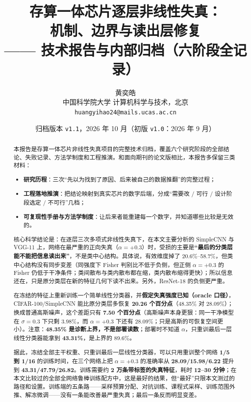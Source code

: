 \documentclass[11pt,a4paper]{ctexart}
\title{\bfseries 存算一体芯片逐层非线性失真：\\ 机制、边界与读出层修复\\[6pt]
       \large —— 技术报告与内部归档（六阶段全记录）}
\author{黄奕皓\\[2pt] \small 中国科学院大学 计算机科学与技术，北京\\ \small \texttt{huangyihao24@mails.ucas.ac.cn}}
\date{归档版本 \texttt{v1.1}，2026 年 10 月（初版 \texttt{v1.0}：2026 年 9 月）}
\begin{document}
\maketitle

\vspace{-1.0em}
\begin{abstract}
\noindent
本报告是存算一体芯片非线性失真项目的完整技术归档，覆盖六个研究阶段的全部结论、失败记录、方法学制度和工程推演。和面向期刊的论文版相比，本报告多保留三类材料：
\begin{itemize}[leftmargin=1.5em,itemsep=1pt]
\item \textbf{研究历程}：三次“先以为找到了原因、后来被自己的数据推翻”的完整过程；
\item \textbf{工程落地推演}：把结论映射到真实芯片的数字后端，分成“需要改 / 可行 / 设计阶段选定 / 不可行”几档；
\item \textbf{可复现性手册与方法学制度}：让后来者能重建每一个数字，并知道哪些比较是无效的。
\end{itemize}

核心科学结论是：在逐层三次多项式非线性失真下，在本文主要分析的 SimpleCNN 与 VGG-11 上，网络在最严重的正向失真（$\alpha=+0.3$）时，受损的主要是\textbf{“最后的分类层能不能把信息读出来”}，不是类中心结构。具体说，有效维度掉了 20.6\%--58.7\%，但类中心结构没有同步变差（同强度下 Fisher 判别比不低于负侧，但正侧 $\alpha=+0.3$ 的 Fisher 仍低于干净条件；类间散布与类内散布都在缩，类内散布缩得更快）；所以信息还在，只是原分类层在新的特征几何下读不出来。另外，ResNet-18 的负侧更严重。

在冻结的特征上重新训练一个简单线性分类器，并\textbf{假定失真强度已知（oracle 口径）}，CIFAR-100/SimpleCNN 能比原分类层多恢复 \textbf{20.26 个百分点}（48.35\% 对 28.09\%）；换成普通高斯噪声，这个差距只有 \textbf{7.50 个百分点}（高斯噪声本身更狠：同一干净模型在 $\sigma=0.3$ 下只剩 3.98\%，而 $\alpha=+0.3$ 下还有 28.09\%；只是高斯的可恢复空间更小）。注意：\textbf{48.35\% 是诊断上界，不是部署读数}；部署时不知道 $\alpha$，只重训最后一层线性分类器能拿到 \textbf{43.31\%}，是上界的 89.6\%。

据此，冻结全部主干权重、只重训最后一层线性分类器，可以只用重训整个网络 \textbf{1/5 到 1/16} 的训练时间，在三个网络上把 $\alpha=+0.3$ 的准确率从 \textbf{28.09/15.98/6.22} 提升到 \textbf{43.31/47.79/26.82}。训练需要约 \textbf{2 万条带标签的失真特征}，耗时 \textbf{12--30 分钟}；在本文比较过的全部全网络鲁棒训练配方中，这是最好的结果，但“最好”只限本文测过的路径和设置。训练端的五条路——采样预算分配、对抗训练、课程式采样、训练范围外推、解冻微调——没有一条能改善最严重失真；最后一条反而明显变差。


\end{abstract}
\end{document}

